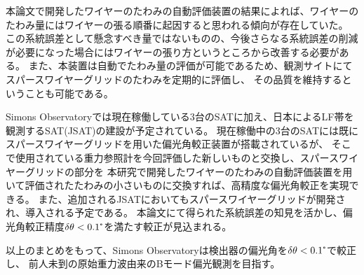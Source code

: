 \documentclass[../../main.tex]{subfiles}
\begin{document}
本論文で開発したワイヤーのたわみの自動評価装置の結果によれば、ワイヤーのたわみ量にはワイヤーの張る順番に起因すると思われる傾向が存在していた。
この系統誤差として懸念すべき量ではないものの、今後さらなる系統誤差の削減が必要になった場合にはワイヤーの張り方というところから改善する必要がある。
また、本装置は自動でたわみ量の評価が可能であるため、観測サイトにてスパースワイヤーグリッドのたわみを定期的に評価し、
その品質を維持するということも可能である。

Simons Observatoryでは現在稼働している3台のSATに加え、日本によるLF帯を観測するSAT(JSAT)の建設が予定されている。
現在稼働中の3台のSATには既にスパースワイヤーグリッドを用いた偏光角較正装置が搭載されているが、
そこで使用されている重力参照計を今回評価した新しいものと交換し、スパースワイヤーグリッドの部分を
本研究で開発したワイヤーのたわみの自動評価装置を用いて評価されたたわみの小さいものに交換すれば、高精度な偏光角較正を実現できる。
また、追加されるJSATにおいてもスパースワイヤーグリッドが開発され、導入される予定である。
本論文にて得られた系統誤差の知見を活かし、偏光角較正精度$\delta\theta<0.1\tcdegree$を満たす較正が見込まれる。

以上のまとめをもって、Simons Observatoryは検出器の偏光角を$\delta\theta<0.1\tcdegree$で較正し、
前人未到の原始重力波由来のBモード偏光観測を目指す。
\end{document}
